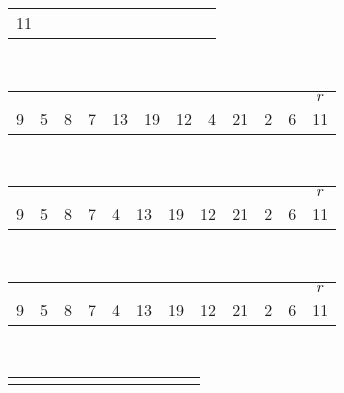 \documentclass[addpoints,11pt]{exam}
\begin{document}
\begin{questions}
\begin{solutionorbox}
\begin{tabular}{|c|c|c|c|c|c|c|c|c|c|c|c|}
				11
			\end{tabular}\\
			\begin{tabular}{|c|c|c|c|c|c|c|c|c|c|c|c|}
				\multicolumn{1}{c}{}&
				\multicolumn{1}{c}{}&
				\multicolumn{1}{c}{}&
				\multicolumn{1}{c}{}&
				\multicolumn{1}{c}{}&
				\multicolumn{1}{c}{}&
				\multicolumn{1}{c}{}&
				\multicolumn{1}{c}{}&
				\multicolumn{1}{c}{}&
				\multicolumn{1}{c}{}&
				\multicolumn{1}{c}{}&
				\multicolumn{1}{c}{$r$}\\
				\cellcolor{lightred}9&
				\cellcolor{lightred}5&
				\cellcolor{lightred}8&
				\cellcolor{lightred}7&
				\cellcolor{lightred}13&
				\cellcolor{lightred}19&
				\cellcolor{lightred}12&
				4&
				21&
				2&
				6&
				11
			\end{tabular}\\
			\begin{tabular}{|c|c|c|c|c|c|c|c|c|c|c|c|}
				\multicolumn{1}{c}{}&
				\multicolumn{1}{c}{}&
				\multicolumn{1}{c}{}&
				\multicolumn{1}{c}{}&
				\multicolumn{1}{c}{}&
				\multicolumn{1}{c}{}&
				\multicolumn{1}{c}{}&
				\multicolumn{1}{c}{}&
				\multicolumn{1}{c}{}&
				\multicolumn{1}{c}{}&
				\multicolumn{1}{c}{}&
				\multicolumn{1}{c}{$r$}\\
				\cellcolor{lightred}9&
				\cellcolor{lightred}5&
				\cellcolor{lightred}8&
				\cellcolor{lightred}7&
				\cellcolor{lightred}4&
				\cellcolor{lightred}13&
				\cellcolor{lightred}19&
				\cellcolor{lightred}12&
				21&
				2&
				6&
				11
			\end{tabular}\\
			\begin{tabular}{|c|c|c|c|c|c|c|c|c|c|c|c|}
				\multicolumn{1}{c}{}&
				\multicolumn{1}{c}{}&
				\multicolumn{1}{c}{}&
				\multicolumn{1}{c}{}&
				\multicolumn{1}{c}{}&
				\multicolumn{1}{c}{}&
				\multicolumn{1}{c}{}&
				\multicolumn{1}{c}{}&
				\multicolumn{1}{c}{}&
				\multicolumn{1}{c}{}&
				\multicolumn{1}{c}{}&
				\multicolumn{1}{c}{$r$}\\
				\cellcolor{lightred}9&
				\cellcolor{lightred}5&
				\cellcolor{lightred}8&
				\cellcolor{lightred}7&
				\cellcolor{lightred}4&
				\cellcolor{lightred}13&
				\cellcolor{lightred}19&
				\cellcolor{lightred}12&
				\cellcolor{lightred}21&
				2&
				6&
				11
			\end{tabular}\\
			\begin{tabular}{|c|c|c|c|c|c|c|c|c|c|c|c|}
				\multicolumn{1}{c}{}&
				\multicolumn{1}{c}{}&

\end{tabular}
\end{solutionorbox}
\end{questions}
\end{document}
